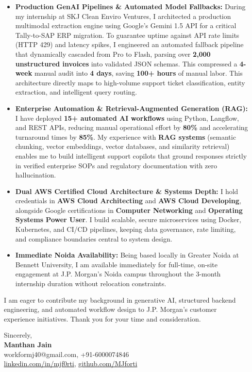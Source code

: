 \documentclass[letterpaper,10pt]{article}
\begin{document}
\begin{itemize}[leftmargin=0.18in, itemsep=2.5pt, topsep=2.5pt]
  \item \textbf{Production GenAI Pipelines \& Automated Model Fallbacks:} During my internship at SKJ Clean Enviro Ventures, I architected a production multimodal extraction engine using Google's Gemini 1.5 API for a critical Tally-to-SAP ERP migration. To guarantee uptime against API rate limits (HTTP 429) and latency spikes, I engineered an automated fallback pipeline that dynamically cascaded from Pro to Flash, parsing over \textbf{2,000 unstructured invoices} into validated JSON schemas. This compressed a \textbf{4-week} manual audit into \textbf{4 days}, saving \textbf{100+ hours} of manual labor. This architecture directly maps to high-volume support ticket classification, entity extraction, and intelligent query routing.

  \item \textbf{Enterprise Automation \& Retrieval-Augmented Generation (RAG):} I have deployed \textbf{15+ automated AI workflows} using Python, Langflow, and REST APIs, reducing manual operational effort by \textbf{80\%} and accelerating turnaround times by \textbf{85\%}. My experience with \textbf{RAG systems} (semantic chunking, vector embeddings, vector databases, and similarity retrieval) enables me to build intelligent support copilots that ground responses strictly in verified enterprise SOPs and regulatory documentation with zero hallucination.

  \item \textbf{Dual AWS Certified Cloud Architecture \& Systems Depth:} I hold credentials in \textbf{AWS Cloud Architecting} and \textbf{AWS Cloud Developing}, alongside Google certifications in \textbf{Computer Networking} and \textbf{Operating Systems Power User}. I build scalable, secure microservices using Docker, Kubernetes, and CI/CD pipelines, keeping data governance, rate limiting, and compliance boundaries central to system design.

  \item \textbf{Immediate Noida Availability:} Being based locally in Greater Noida at Bennett University, I am available immediately for full-time, on-site engagement at J.P. Morgan's Noida campus throughout the 3-month internship duration without relocation constraints.
\end{itemize}

\vspace{3pt}
I am eager to contribute my background in generative AI, structured backend engineering, and automated workflow design to J.P. Morgan's customer experience initiatives. Thank you for your time and consideration.

\vspace{8pt}
Sincerely, \\[8pt]
\textbf{Manthan Jain} \\
\small
workformj40@gmail.com, +91-6000074846 \\
\href{https://www.linkedin.com/in/mjf0rti}{linkedin.com/in/mjf0rti}, \href{https://github.com/MJforti}{github.com/MJforti}
\end{document}
